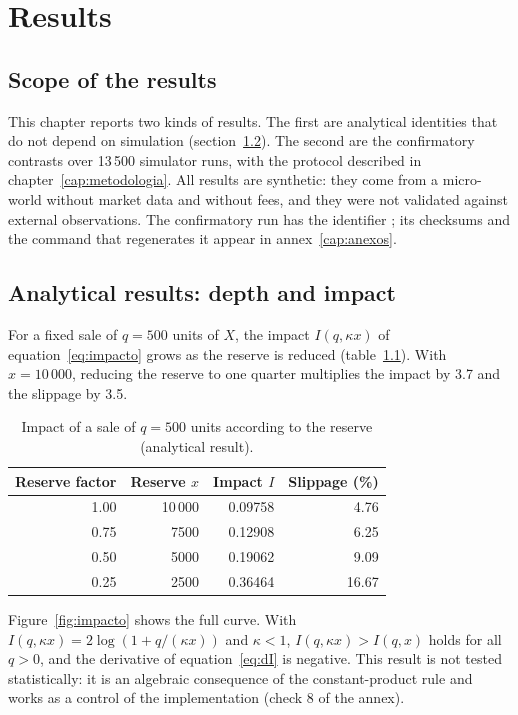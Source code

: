 \chapter{Results}
\label{cap:resultados}

\section{Scope of the results}

This chapter reports two kinds of results. The first are analytical identities that do not depend on simulation (section~\ref{sec:res-analitico}). The second are the confirmatory contrasts over 13\,500 simulator runs, with the protocol described in chapter~\ref{cap:metodologia}. All results are synthetic: they come from a micro-world without market data and without fees, and they were not validated against external observations. The confirmatory run has the identifier \code{\RunID}; its checksums and the command that regenerates it appear in annex~\ref{cap:anexos}.

\section{Analytical results: depth and impact}
\label{sec:res-analitico}

For a fixed sale of $q=500$ units of $X$, the impact $I(q,\kappa x)$ of equation~\eqref{eq:impacto} grows as the reserve is reduced (table~\ref{tab:impacto}). With $x=10\,000$, reducing the reserve to one quarter multiplies the impact by 3.7 and the slippage by 3.5.

\begin{table}[htbp]
\centering
\caption{Impact of a sale of $q=500$ units according to the reserve (analytical result).}
\label{tab:impacto}
\small
\begin{tabular}{@{}rrrr@{}}
\toprule
Reserve factor & Reserve $x$ & Impact $I$ & Slippage (\%) \\
\midrule
1.00 & 10\,000 & 0.09758 & 4.76 \\
0.75 & 7500 & 0.12908 & 6.25 \\
0.50 & 5000 & 0.19062 & 9.09 \\
0.25 & 2500 & 0.36464 & 16.67 \\
\bottomrule
\end{tabular}
\end{table}

Figure~\ref{fig:impacto} shows the full curve. With $I(q,\kappa x)=2\log(1+q/(\kappa x))$ and $\kappa<1$, $I(q,\kappa x)>I(q,x)$ holds for all $q>0$, and the derivative of equation~\eqref{eq:dI} is negative. This result is not tested statistically: it is an algebraic consequence of the constant-product rule and works as a control of the implementation (check 8 of the annex).

